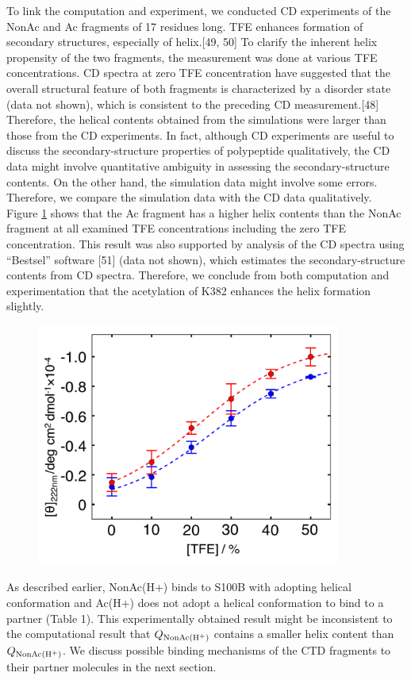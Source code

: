 To link the computation and experiment, we conducted CD experiments of the NonAc and Ac fragments of 17 residues long. TFE enhances formation of secondary structures, especially of helix.[49, 50] To clarify the inherent helix propensity of the two fragments, the measurement was done at various TFE concentrations. CD spectra at zero TFE concentration have suggested that the overall structural feature of both fragments is characterized by a disorder state (data not shown), which is consistent to the preceding CD measurement.[48] Therefore, the helical contents obtained from the simulations were larger than those from the CD experiments. In fact, although CD experiments are useful to discuss the secondary-structure properties of polypeptide qualitatively, the CD data might involve quantitative ambiguity in assessing the secondary-structure contents. On the other hand, the simulation data might involve some errors. Therefore, we compare the simulation data with the CD data qualitatively. Figure \ref{fig:TFE_mesure} shows that the Ac fragment has a higher helix contents than the NonAc fragment at all examined TFE concentrations including the zero TFE concentration. This result was also supported by analysis of the CD spectra using “Bestsel” software [51] (data not shown), which estimates the secondary-structure contents from CD spectra. Therefore, we conclude from both computation and experimentation that the acetylation of K382 enhances the helix formation slightly.

\begin{figure}
  \centering
  \includegraphics[width=10cm]{../single_CTD/figures_p53ctd/8.pdf}
  \caption{\label{fig:TFE_mesure}}
\end{figure}

As described earlier, NonAc(H+) binds to S100B with adopting helical conformation and Ac(H+) does not adopt a helical conformation to bind to a partner (Table 1). This experimentally obtained result might be inconsistent to the computational result that $Q_{\rm NonAc(H^+)}$ contains a smaller helix content than $Q_{\rm NonAc(H^+)}$. We discuss possible binding mechanisms of the CTD fragments to their partner molecules in the next section.

